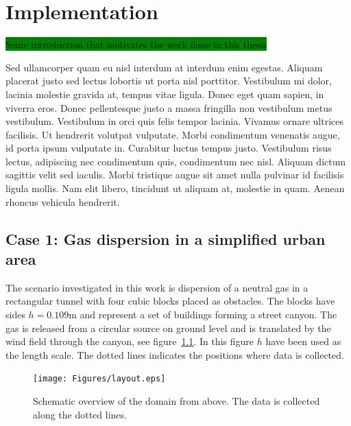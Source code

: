 
\chapter{Implementation} %

\label{implementation} %



\colorbox{green}{Some introduction that motivates the work done in this thesis}

Sed ullamcorper quam eu nisl interdum at interdum enim egestas. Aliquam placerat justo sed lectus lobortis ut porta nisl porttitor. Vestibulum mi dolor, lacinia molestie gravida at, tempus vitae ligula. Donec eget quam sapien, in viverra eros. Donec pellentesque justo a massa fringilla non vestibulum metus vestibulum. Vestibulum in orci quis felis tempor lacinia. Vivamus ornare ultrices facilisis. Ut hendrerit volutpat vulputate. Morbi condimentum venenatis augue, id porta ipsum vulputate in. Curabitur luctus tempus justo. Vestibulum risus lectus, adipiscing nec condimentum quis, condimentum nec nisl. Aliquam dictum sagittis velit sed iaculis. Morbi tristique augue sit amet nulla pulvinar id facilisis ligula mollis. Nam elit libero, tincidunt ut aliquam at, molestie in quam. Aenean rhoncus vehicula hendrerit.

\section{Case 1: Gas dispersion in a simplified urban area}
The scenario investigated in this work is dispersion of a neutral gas in a rectangular tunnel
with four cubic blocks placed as obstacles. The blocks have sides $h = 0.109$m and represent a 
set of buildings forming a street canyon. The gas is released from a circular source on 
ground level and
is translated by the wind field through the canyon, see figure~\ref{fig:layout}.
In this figure $h$ have been used as the length scale. The dotted lines
indicates the positions where data is collected.
%
\begin{figure}[h]
	\texttt{[image: Figures/layout.eps]}
	\caption{Schematic overview of the domain from above. The data is collected along the dotted lines.}
	\label{fig:layout}
\end{figure}
%

